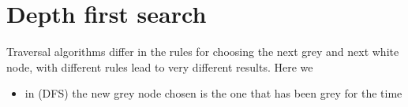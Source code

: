 %
%
%

\chapter{Depth first search }

Traversal algorithms differ in the rules for choosing the next grey and next white node, with  different rules lead
to very different results.  Here we

\begin{itemize}
\item in  (DFS) the new grey node chosen is the one
that has been grey for the  time
\end{itemize}
 

